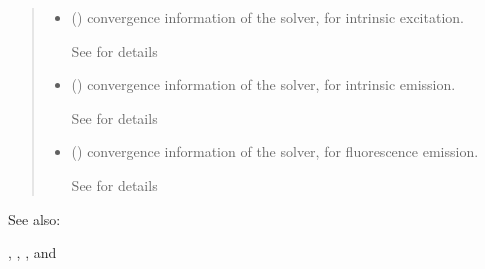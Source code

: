 \documentclass[letterpaper,10pt,english]{sphinxmanual}
\begin{document}
\begin{fulllineitems}
\begin{quote}
\begin{description}
\begin{itemize}
\sphinxAtStartPar
See {\hyperref[\detokenize{_autosummary/nirfasterff.base.data.FLdata:nirfasterff.base.data.FLdata}]{}} for details.

\item {} 
\sphinxAtStartPar
{} () \textendash{} convergence information of the solver, for intrinsic excitation.

\sphinxAtStartPar
See {\hyperref[\detokenize{_autosummary/nirfasterff.utils.ConvergenceInfo:nirfasterff.utils.ConvergenceInfo}]{}} for details

\item {} 
\sphinxAtStartPar
{} () \textendash{} convergence information of the solver, for intrinsic emission.

\sphinxAtStartPar
See {\hyperref[\detokenize{_autosummary/nirfasterff.utils.ConvergenceInfo:nirfasterff.utils.ConvergenceInfo}]{}} for details

\item {} 
\sphinxAtStartPar
{} () \textendash{} convergence information of the solver, for fluorescence emission.

\sphinxAtStartPar
See {\hyperref[\detokenize{_autosummary/nirfasterff.utils.ConvergenceInfo:nirfasterff.utils.ConvergenceInfo}]{}} for details

\end{itemize}


\end{description}\end{quote}


\begin{sphinxseealso}{See also:}

\sphinxAtStartPar
{\hyperref[\detokenize{_autosummary/nirfasterff.math.get_field_CW:nirfasterff.math.get_field_CW}]{}}, {\hyperref[\detokenize{_autosummary/nirfasterff.math.gen_mass_matrix:nirfasterff.math.gen_mass_matrix}]{}}, {\hyperref[\detokenize{_autosummary/nirfasterff.math.gen_sources:nirfasterff.math.gen_sources}]{}}, and {\hyperref[\detokenize{_autosummary/nirfasterff.math.gen_sources_fl:nirfasterff.math.gen_sources_fl}]{}}


\end{sphinxseealso}


\end{fulllineitems}
\end{document}
